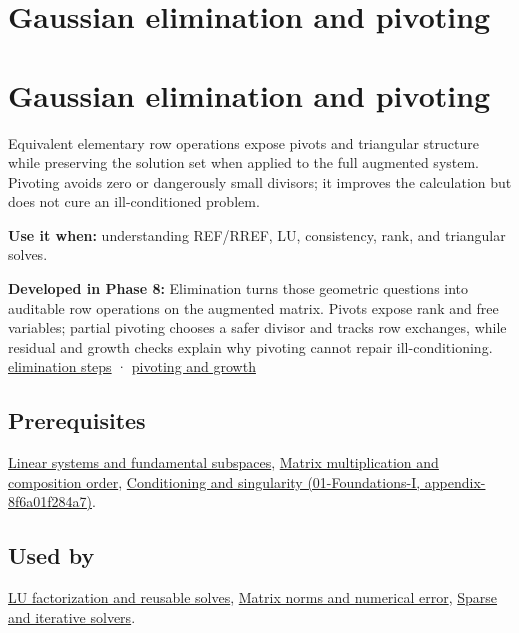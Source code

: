 \hypertarget{appendix-f6e77f4a200f}{}
\section*{Gaussian elimination and pivoting}
\section{Gaussian elimination and pivoting}\label{gaussian-elimination-and-pivoting}

Equivalent elementary row operations expose pivots and triangular structure while preserving the solution set when applied to the full augmented system. Pivoting avoids zero or dangerously small divisors; it improves the calculation but does not cure an ill-conditioned problem.

\textbf{Use it when:} understanding REF/RREF, LU, consistency, rank, and triangular solves.

\textbf{Developed in Phase 8:} Elimination turns those geometric questions into auditable row operations on the augmented matrix. Pivots expose rank and free variables; partial pivoting chooses a safer divisor and tracks row exchanges, while residual and growth checks explain why pivoting cannot repair ill-conditioning. \href{Continuous\%20Notes/Computing\%20Foundations\%20-\%20From\%20Bits\%20to\%20C++\%20and\%20Systems\%20APIs\#Elimination\%20turns\%20the\%20geometry\%20into\%20an\%20auditable\%20calculation}{elimination steps} · \href{Continuous\%20Notes/Computing\%20Foundations\%20-\%20From\%20Bits\%20to\%20C++\%20and\%20Systems\%20APIs\#Pivoting\%20separates\%20algorithm\%20failure\%20from\%20matrix\%20failure}{pivoting and growth}

\subsection{Prerequisites}\label{prerequisites}

\hyperref[appendix-8572a4a060c1]{Linear systems and fundamental subspaces}, \hyperref[appendix-ab31ef447dbf]{Matrix multiplication and composition order}, \href{}{Conditioning and singularity (01-Foundations-I, appendix-8f6a01f284a7)}.

\subsection{Used by}\label{used-by}

\hyperref[appendix-55e4b5b0a1e6]{LU factorization and reusable solves}, \hyperref[appendix-f8657bac66e5]{Matrix norms and numerical error}, \hyperref[appendix-67c87a3d9e94]{Sparse and iterative solvers}.

